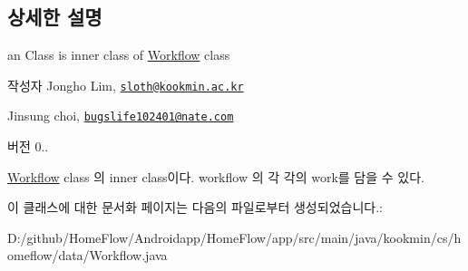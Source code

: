 \subsection{상세한 설명}
an Class is inner class of \hyperlink{classkookmin_1_1cs_1_1homeflow_1_1data_1_1_workflow}{Workflow} class 

\begin{DoxyAuthor}{작성자}
Jongho Lim, \href{mailto:sloth@kookmin.ac.kr}{\tt sloth@kookmin.\+ac.\+kr} 

Jinsung choi, \href{mailto:bugslife102401@nate.com}{\tt bugslife102401@nate.\+com} 
\end{DoxyAuthor}
\begin{DoxyVersion}{버전}
0..
\end{DoxyVersion}
\hyperlink{classkookmin_1_1cs_1_1homeflow_1_1data_1_1_workflow}{Workflow} class 의 inner class이다. workflow 의 각 각의 work를 담을 수 있다. 

이 클래스에 대한 문서화 페이지는 다음의 파일로부터 생성되었습니다.\+:\begin{DoxyCompactItemize}
\item 
D\+:/github/\+Home\+Flow/\+Androidapp/\+Home\+Flow/app/src/main/java/kookmin/cs/homeflow/data/Workflow.\+java\end{DoxyCompactItemize}
